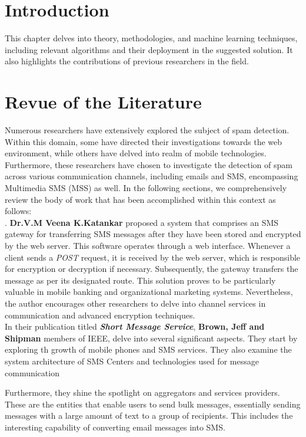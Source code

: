\documentclass[12pt,a4paper, oneside]{book}
\begin{document}
    \section{Introduction}
    This chapter delves into theory, methodologies, and machine learning techniques, including relevant algorithms and their deployment in the suggested solution. It also highlights the contributions of previous researchers in the field.  
    \section{Revue of the Literature}  
    Numerous researchers have extensively explored the subject of spam detection. Within this domain, some have directed their investigations towards the web environment, while others have delved into realm of mobile	technologies.\\
    
    Furthermore, these researchers have chosen to investigate the detection of spam across various communication channels, including emails and SMS, encompassing Multimedia SMS (MSS) as well. In the following sections, we comprehensively review the body of work that has been accomplished within this context as follows: \\
         
	\cite{katankar2010short}. \textbf{Dr.V.M Veena K.Katankar}
	proposed a system that comprises an SMS gateway for transferring SMS messages after they have been stored and encrypted by the web server. This software operates through a web interface. Whenever a client sends a \textit{POST} request, it is received by the web server, which is responsible for encryption or decryption if necessary. Subsequently, the gateway transfers the message as per its designated route. This solution proves to be particularly valuable in mobile banking and organizational marketing systems. Nevertheless, the author encourages other researchers to delve into channel services in communication and advanced encryption techniques.\\
		
	\cite{brown2007sms} In their publication titled \textbf{\textit{Short Message Service}}, \textbf{Brown, Jeff and Shipman} members of IEEE, delve into several significant aspects. They start by exploring th growth of mobile phones and SMS services. They also examine the system architecture of SMS Centers and technologies used for message communication
	
	Furthermore, they shine the spotlight on aggregators and services providers. These are the entities that enable users to send bulk messages, essentially sending messages with a large amount of text to a group of recipients. This includes the interesting capability of converting email messages into SMS.
	
\end{document}
